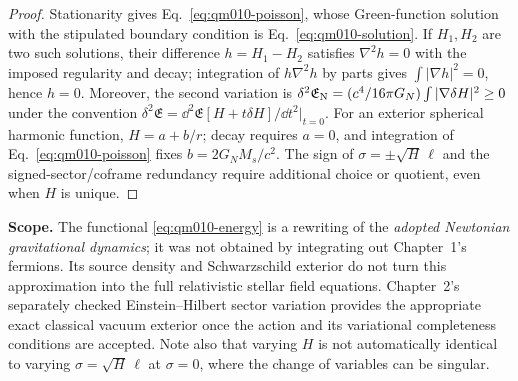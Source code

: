 \documentclass[11pt,a4paper]{article}
\begin{document}
\begin{proof}
Stationarity gives Eq.~\eqref{eq:qm010-poisson}, whose Green-function solution with the stipulated boundary condition is Eq.~\eqref{eq:qm010-solution}. If $H_1,H_2$ are two such solutions, their difference $h=H_1-H_2$ satisfies $\nabla^2h=0$ with the imposed regularity and decay; integration of $h\nabla^2h$ by parts gives $\int|\nabla h|^2=0$, hence $h=0$. Moreover, the second variation is $\delta^2\mathfrak E_{\rm N}=(c^4/16\pi G_N)\int|\nabla\delta H|^2\ge0$ under the convention $\delta^2\mathfrak E=\dd^2\mathfrak E[H+t\delta H]/\dd t^2|_{t=0}$. For an exterior spherical harmonic function, $H=a+b/r$; decay requires $a=0$, and integration of Eq.~\eqref{eq:qm010-poisson} fixes $b=2G_NM_s/c^2$. The sign of $\sigma=\pm\sqrt H\,\ell$ and the signed-sector/coframe redundancy require additional choice or quotient, even when $H$ is unique.
\end{proof}
\textbf{Scope.} The functional \eqref{eq:qm010-energy} is a rewriting of the \emph{adopted Newtonian gravitational dynamics}; it was not obtained by integrating out Chapter~1's fermions. Its source density and Schwarzschild exterior do not turn this approximation into the full relativistic stellar field equations. Chapter~2's separately checked Einstein--Hilbert sector variation provides the appropriate exact classical vacuum exterior once the action and its variational completeness conditions are accepted. Note also that varying $H$ is not automatically identical to varying $\sigma=\sqrt H\,\ell$ at $\sigma=0$, where the change of variables can be singular.
\end{document}
